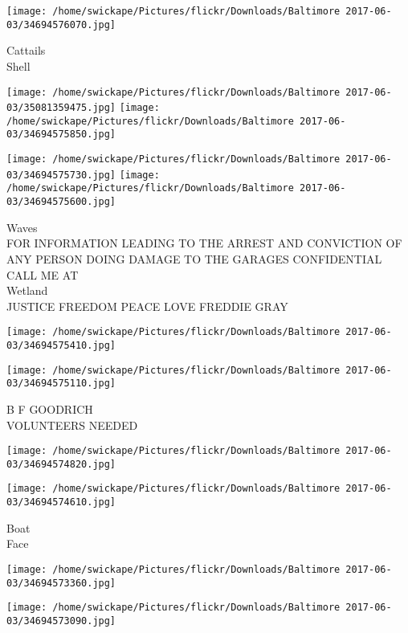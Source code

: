 \documentclass[10pt,letterpaper]{article}
\begin{document}
\vspace{0.25in}
\texttt{[image: /home/swickape/Pictures/flickr/Downloads/Baltimore 2017-06-03/34694576070.jpg]}

Cattails\\
Shell\\
\pagebreak

\texttt{[image: /home/swickape/Pictures/flickr/Downloads/Baltimore 2017-06-03/35081359475.jpg]}
\texttt{[image: /home/swickape/Pictures/flickr/Downloads/Baltimore 2017-06-03/34694575850.jpg]}

\texttt{[image: /home/swickape/Pictures/flickr/Downloads/Baltimore 2017-06-03/34694575730.jpg]}
\texttt{[image: /home/swickape/Pictures/flickr/Downloads/Baltimore 2017-06-03/34694575600.jpg]}

Waves\\
FOR INFORMATION LEADING TO THE ARREST AND CONVICTION OF ANY PERSON DOING DAMAGE TO THE GARAGES CONFIDENTIAL CALL ME AT\\
Wetland\\
JUSTICE FREEDOM PEACE LOVE FREDDIE GRAY\\
\pagebreak

\texttt{[image: /home/swickape/Pictures/flickr/Downloads/Baltimore 2017-06-03/34694575410.jpg]}

\vspace{0.25in}
\texttt{[image: /home/swickape/Pictures/flickr/Downloads/Baltimore 2017-06-03/34694575110.jpg]}

B F GOODRICH\\
VOLUNTEERS NEEDED\\
\pagebreak

\texttt{[image: /home/swickape/Pictures/flickr/Downloads/Baltimore 2017-06-03/34694574820.jpg]}

\vspace{0.25in}
\texttt{[image: /home/swickape/Pictures/flickr/Downloads/Baltimore 2017-06-03/34694574610.jpg]}

Boat\\
Face\\
\pagebreak

\texttt{[image: /home/swickape/Pictures/flickr/Downloads/Baltimore 2017-06-03/34694573360.jpg]}

\vspace{0.25in}
\texttt{[image: /home/swickape/Pictures/flickr/Downloads/Baltimore 2017-06-03/34694573090.jpg]}
\end{document}
